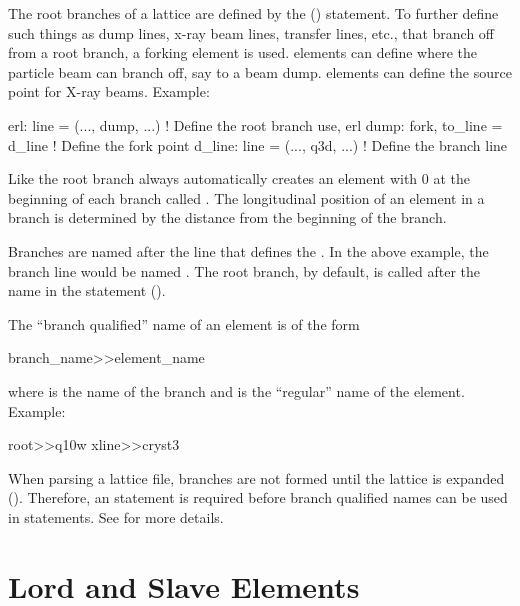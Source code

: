 The root branches of a lattice are defined by the  () statement. To further
define such things as dump lines, x-ray beam lines, transfer lines, etc., that branch off from a
root branch, a forking element is used.   elements can define where the particle beam can
branch off, say to a beam dump.  elements can define the source point for X-ray
beams.  Example:
\begin{example}
  erl: line = (..., dump, ...)               ! Define the root branch 
  use, erl
  dump: fork, to_line = d_line               ! Define the fork point
  d_line: line = (..., q3d, ...)             ! Define the branch line
\end{example}

Like the root branch \bmad always automatically creates an element with  0 at the
beginning of each branch called . The longitudinal  position of an element in a
branch is determined by the distance from the beginning of the branch.

Branches are named after the line that defines the . In the above example, the branch
line would be named . The root branch, by default, is called after the name in the
 statement ().

The ``branch qualified'' name of an element is of the form
\begin{example}
  branch_name>>element_name
\end{example}
where  is the name of the branch and  is the ``regular'' name of
the element. Example:
\begin{example}
  root>>q10w
  xline>>cryst3
\end{example}
When parsing a lattice file, branches are not formed until the lattice is expanded
(). Therefore, an  statement is required before branch qualified
names can be used in statements. See  for more details.

\section{Lord and Slave Elements}
\label{s:lord.slave}

